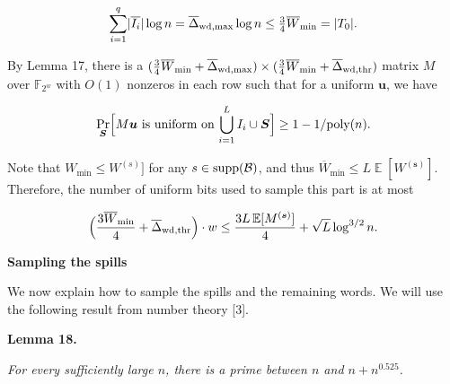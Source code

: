 \documentclass[10pt,a4paper]{article}
\begin{document}
\[\begin{gathered}
\sum_{i=1}^{q}\lvert\overline{I_{i}}\rvert\log n=\overline{\Delta}_{{\rm wd},\max}\log n\leq\tfrac{3}{4}\overline{W}_{\min}=\lvert T_{0}\rvert.
\end{gathered}\]




By Lemma 17, there is a $(\tfrac{3}{4}\overline{W}_{\min}+\overline{\Delta}_{{\rm wd},\max})\times(\tfrac{3}{4}\overline{W}_{\min}+\overline{\Delta}_{{\rm wd},{\rm thr}})$ matrix $M$ over $\mathbb{F}_{2^{w}}$ with $O(1)$ nonzeros in each row such that for a uniform $\boldsymbol{u}$, we have\par


\[\begin{gathered}
\Pr_{\boldsymbol{S}}\Bigl[\text{$M\boldsymbol{u}$ is uniform on $\bigcup_{i=1}^{L}I_{i}\cup\boldsymbol{S}$}\Bigr]\geq 1-1/\textnormal{poly}(n).
\end{gathered}\]




Note that $W_{\min}\leq W^{(s)}]$ for any $s\in{\rm supp}(\mathcal{B})$, and thus $\overline{W}_{\min}\leq L\operatorname{\mathbb{E}}[W^{(\boldsymbol{s})}]$.
Therefore, the number of uniform bits used to sample this part is at most\par


\[\begin{gathered}
\displaystyle\Bigl(\frac{3\overline{W}_{\min}}{4}+\overline{\Delta}_{{\rm wd},{\rm thr}}\Bigr)\cdot w\leq\frac{3L\operatorname{\mathbb{E}}[M^{(\boldsymbol{s})}]}{4}+\sqrt{L}\log^{3/2}n.
\end{gathered}\]





\par\medskip\noindent\textbf{Sampling the spills}\par




We now explain how to sample the spills and the remaining words.
We will use the following result from number theory [3].\par





\par\medskip\noindent\textbf{
\textbf{Lemma 18}\textbf{.}
}\par



\emph{For every sufficiently large $n$, there is a prime between $n$ and $n+n^{0.525}$.}\par
\end{document}
